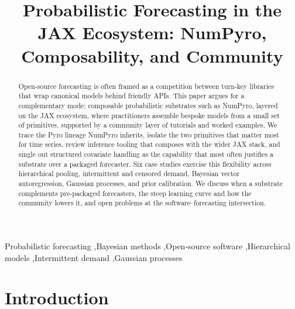 \documentclass[11pt,3p,review,authoryear]{elsarticle}
\begin{document}
\begin{frontmatter}

\title{Probabilistic Forecasting in the JAX Ecosystem:
NumPyro, Composability, and Community}


\begin{abstract}
Open-source forecasting is often framed as a competition between turn-key libraries that wrap canonical models behind friendly APIs. This paper argues for a complementary mode: composable probabilistic substrates such as NumPyro, layered on the JAX ecosystem, where practitioners assemble bespoke models from a small set of primitives, supported by a community layer of tutorials and worked examples. We trace the Pyro lineage NumPyro inherits, isolate the two primitives that matter most for time series, review inference tooling that composes with the wider JAX stack, and single out structured covariate handling as the capability that most often justifies a substrate over a packaged forecaster. Six case studies exercise this flexibility across hierarchical pooling, intermittent and censored demand, Bayesian vector autoregression, Gaussian processes, and prior calibration. We discuss when a substrate complements pre-packaged forecasters, the steep learning curve and how the community lowers it, and open problems at the software--forecasting intersection.
\end{abstract}

\begin{keyword}
Probabilistic forecasting \sep Bayesian methods \sep Open-source software \sep Hierarchical models \sep Intermittent demand \sep Gaussian processes
\end{keyword}

\end{frontmatter}


\section{Introduction}
\end{document}
